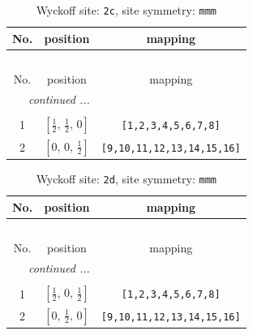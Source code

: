 \documentclass[fleqn,8pt]{jsarticle}
\begin{document}
\renewcommand{\arraystretch}{1.2}
\begin{longtable}{ccc}
\caption{Wyckoff site: {\tt 2c}, site symmetry: {\tt mmm}}
 \\
 \hline \hline
No. & position & mapping \\ \hline \endfirsthead

\multicolumn{2}{l}{\tablename\ \thetable{}} \\
 \hline \hline
No. & position & mapping \\ \hline \endhead

 \hline \hline
\multicolumn{2}{r}{\footnotesize\it continued ...} \\ \endfoot

 \hline \hline
\multicolumn{2}{r}{} \\ \endlastfoot

1 & $\left[ \frac{1}{2},\, \frac{1}{2},\, 0 \right]$ & {\tt [1,2,3,4,5,6,7,8]} \\ \hline
2 & $\left[ 0,\, 0,\, \frac{1}{2} \right]$ & {\tt [9,10,11,12,13,14,15,16]} \\
\end{longtable}
\renewcommand{\arraystretch}{1.2}
\begin{longtable}{ccc}
\caption{Wyckoff site: {\tt 2d}, site symmetry: {\tt mmm}}
 \\
 \hline \hline
No. & position & mapping \\ \hline \endfirsthead

\multicolumn{2}{l}{\tablename\ \thetable{}} \\
 \hline \hline
No. & position & mapping \\ \hline \endhead

 \hline \hline
\multicolumn{2}{r}{\footnotesize\it continued ...} \\ \endfoot

 \hline \hline
\multicolumn{2}{r}{} \\ \endlastfoot

1 & $\left[ \frac{1}{2},\, 0,\, \frac{1}{2} \right]$ & {\tt [1,2,3,4,5,6,7,8]} \\ \hline
2 & $\left[ 0,\, \frac{1}{2},\, 0 \right]$ & {\tt [9,10,11,12,13,14,15,16]} \\
\end{longtable}
\renewcommand{\arraystretch}{1.2}
\end{document}
